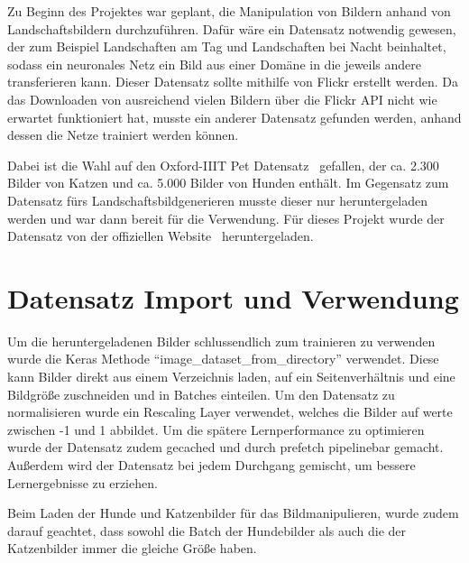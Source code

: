 Zu Beginn des Projektes war geplant, die Manipulation von Bildern anhand von Landschaftsbildern durchzuführen. Dafür wäre ein Datensatz notwendig gewesen, der zum Beispiel Landschaften am Tag und Landschaften bei Nacht beinhaltet, sodass ein neuronales Netz ein Bild aus einer Domäne in die jeweils andere transferieren kann. Dieser Datensatz sollte mithilfe von Flickr erstellt werden. Da das Downloaden von ausreichend vielen Bildern über die Flickr API nicht wie erwartet funktioniert hat, musste ein anderer Datensatz gefunden werden, anhand dessen die Netze trainiert werden können.

Dabei ist die Wahl auf den Oxford-IIIT Pet Datensatz~\cite{parkhi12a} gefallen, der ca. 2.300 Bilder von Katzen und ca. 5.000 Bilder von Hunden enthält. Im Gegensatz zum Datensatz fürs Landschaftsbildgenerieren musste dieser nur heruntergeladen werden und war dann bereit für die Verwendung. Für dieses Projekt wurde der Datensatz von der offiziellen Website~\cite{Pets:Download} heruntergeladen.

\section{Datensatz Import und Verwendung}%
Um die heruntergeladenen Bilder schlussendlich zum trainieren zu verwenden wurde die Keras Methode  \enquote{image\_dataset\_from\_directory} verwendet. Diese kann Bilder direkt aus einem Verzeichnis laden, auf ein Seitenverhältnis und eine Bildgröße zuschneiden und in Batches einteilen. Um den Datensatz zu normalisieren wurde ein Rescaling Layer verwendet, welches die Bilder auf werte zwischen -1 und 1 abbildet. Um die spätere Lernperformance zu optimieren wurde der Datensatz zudem gecached und durch prefetch pipelinebar gemacht. Außerdem wird der Datensatz bei jedem Durchgang gemischt, um bessere Lernergebnisse zu erziehen. 

Beim Laden der Hunde und Katzenbilder für das Bildmanipulieren, wurde zudem darauf geachtet, dass sowohl die Batch der Hundebilder als auch die der Katzenbilder immer die gleiche Größe haben. 













